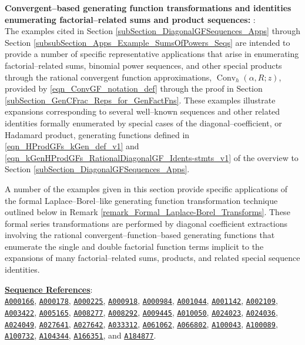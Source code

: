 \documentclass[12pt,reqno]{article}
\numberwithin{sfootnote}{section}
\numberwithin{equation}{section}
\newcommand{\itemlabel}[1]{\textbf{#1}: \\ }
\theoremstyle{plain}
\theoremstyle{definition}
\theoremstyle{remark}
\newcommand{\seqnum}[1]{\href{http://oeis.org/#1}{\texttt{\underline{#1}}}}
\newcommand{\ConvGF}[4]{\ensuremath{\Conv_{#1}\left(#2, #3; #4\right)}}
\DeclareMathOperator{\Conv}{Conv}
\begin{document}
\begin{enumerate}[leftmargin=\parindent,itemsep=-1mm]
\begin{enumerate}[leftmargin=\parindent]
\itemlabel{Convergent--based generating function transformations and 
           identities enumerating factorial--related sums and 
           product sequences:
           \sectionpageref{subSection_DiagonalGFSequences_Apps}} 
The examples cited in 
Section \ref{subSection_DiagonalGFSequences_Apps} through 
Section \ref{subsubSection_Apps_Example_SumsOfPowers_Seqs} 
are intended to provide a number of 
specific representative applications that arise in 
enumerating factorial--related sums, 
binomial power sequences, and other special products through the 
rational convergent function approximations, $\ConvGF{h}{\alpha}{R}{z}$, 
provided by \eqref{eqn_ConvGF_notation_def} through the proof in 
Section \ref{subSection_GenCFrac_Reps_for_GenFactFns}. 
These examples illustrate expansions 
corresponding to several well--known sequences and other related identities 
formally enumerated by special cases of the 
diagonal--coefficient, or Hadamard product, generating functions defined in 
\eqref{eqn_HProdGFs_kGen_def_v1} and 
\eqref{eqn_kGenHProdGFs_RationalDiagonalGF_Idents-stmts_v1} 
of the overview to 
Section \ref{subSection_DiagonalGFSequences_Apps}. 

A number of the examples given in this section provide 
specific applications of the formal Laplace--Borel--like 
generating function transformation technique outlined below in 
Remark \ref{remark_Formal_Laplace-Borel_Transforms}. 
These formal series transformations are 
performed by diagonal coefficient extractions 
involving the rational convergent--function--based 
generating functions that enumerate the single and double 
factorial function terms implicit to the expansions of many 
factorial--related sums, products, and related 
special sequence identities. 

{ 
     \smaller\noindent 
     \textbf{\underline{Sequence References}}: \\ 
     \seqnum{A000166}, \seqnum{A000178}, \seqnum{A000225}, \seqnum{A000918}, 
     \seqnum{A000984}, \seqnum{A001044}, \seqnum{A001142}, 
     \seqnum{A002109}, \seqnum{A003422}, 
     \seqnum{A005165}, \seqnum{A008277}, \seqnum{A008292}, \seqnum{A009445}, 
     \seqnum{A010050}, \seqnum{A024023}, \seqnum{A024036}, \seqnum{A024049}, 
     \seqnum{A027641}, \seqnum{A027642}, \seqnum{A033312}, \seqnum{A061062}, 
     \seqnum{A066802}, \seqnum{A100043}, \seqnum{A100089}, \seqnum{A100732}, 
     \seqnum{A104344}, \seqnum{A166351}, and \seqnum{A184877}. 

} 

\end{enumerate} 


\end{enumerate}
\end{document}
